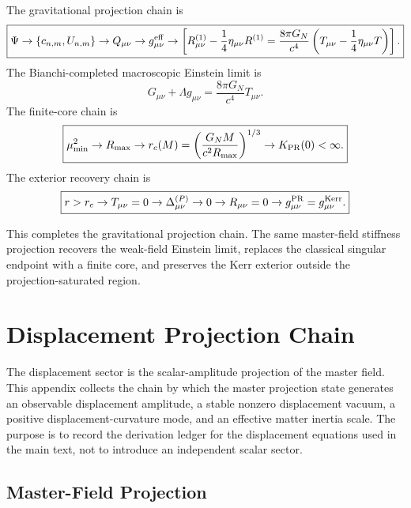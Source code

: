 \documentclass[11pt]{article}
\begin{document}
The gravitational projection chain is
\begin{equation}
\boxed{
\Psi
\rightarrow
\{c_{n,m},U_{n,m}\}
\rightarrow
Q_{\mu\nu}
\rightarrow
g_{\mu\nu}^{\rm eff}
\rightarrow
\left[
R_{\mu\nu}^{(1)}
-
\frac14\eta_{\mu\nu}R^{(1)}
=
\frac{8\pi G_N}{c^4}
\left(
T_{\mu\nu}
-
\frac14\eta_{\mu\nu}T
\right)
\right].
}
\end{equation}
The Bianchi-completed macroscopic Einstein limit is
\begin{equation}
\boxed{
G_{\mu\nu}
+
\Lambda g_{\mu\nu}
=
\frac{8\pi G_N}{c^4}T_{\mu\nu}.
}
\end{equation}
The finite-core chain is
\begin{equation}
\boxed{
\mu_{\min}^2
\rightarrow
R_{\max}
\rightarrow
r_c(M)
=
\left(
\frac{G_NM}{c^2R_{\max}}
\right)^{1/3}
\rightarrow
K_{\rm PR}(0)<\infty.
}
\end{equation}
The exterior recovery chain is
\begin{equation}
\boxed{
r>r_c
\rightarrow
T_{\mu\nu}=0
\rightarrow
\Delta_{\mu\nu}^{(P)}\rightarrow0
\rightarrow
R_{\mu\nu}=0
\rightarrow
g_{\mu\nu}^{\rm PR}
=
g_{\mu\nu}^{\rm Kerr}.
}
\end{equation}

This completes the gravitational projection chain. The same master-field
stiffness projection recovers the weak-field Einstein limit, replaces the
classical singular endpoint with a finite core, and preserves the Kerr exterior
outside the projection-saturated region.

\section{Displacement Projection Chain}
\label{sec:displacement_projection_chain}

The displacement sector is the scalar-amplitude projection of the master field.
This appendix collects the chain by which the master projection state generates
an observable displacement amplitude, a stable nonzero displacement vacuum, a
positive displacement-curvature mode, and an effective matter inertia scale. The
purpose is to record the derivation ledger for the displacement equations used
in the main text, not to introduce an independent scalar sector.

\subsection{Master-Field Projection}
\end{document}
